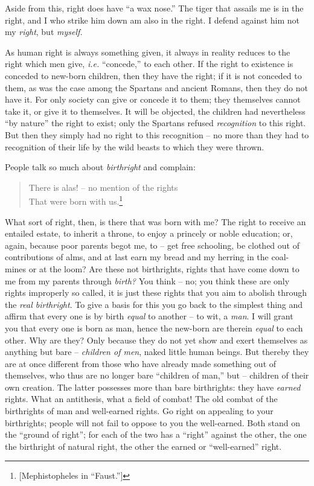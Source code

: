 Aside from this, right does have ``a wax nose.'' The tiger that assails me 
is in the right, and I who strike him down am also in the right. I defend 
against him not my \textit{right}, but \textit{myself.}

As human right is always something given, it always in reality reduces to the 
right which men give, \textit{i.e.} ``concede,'' to each other. If the right 
to existence is conceded to new-born children, then they have the right; if it 
is not conceded to them, as was the case among the Spartans and ancient 
Romans, then they do not have it. For only society can give or concede it to 
them; they themselves cannot take it, or give it to themselves. It will be 
objected, the children had nevertheless ``by nature'' the right to exist; 
only the Spartans refused \textit{recognition} to this right. But then they 
simply had no right to this recognition -- no more than they had to 
recognition of their life by the wild beasts to which they were thrown.

People talk so much about \textit{birthright} and complain:

\begin{quotation}

\noindent{} There is alas! -- no mention of the rights\\
 That were born with us.\footnote{[Mephistopheles in ``Faust.'']} 
\end{quotation}

\noindent{}What sort of right, then, is there that was born with me? The right 
to receive an entailed estate, to inherit a throne, to enjoy a princely or 
noble education; or, again, because poor parents begot me, to -- get free 
schooling, be clothed out of contributions of alms, and at last earn my bread 
and my herring in the coal-mines or at the loom? Are these not birthrights, 
rights that have come down to me from my parents through \textit{birth?} You 
think -- no; you think these are only rights improperly so called, it is just 
these rights that you aim to abolish through the \textit{real birthright}. To 
give a basis for this you go back to the simplest thing and affirm that every 
one is by birth \textit{equal} to another -- to wit, a \textit{man}. I will 
grant you that every one is born as man, hence the new-born are therein 
\textit{equal} to each other. Why are they? Only because they do not yet show 
and exert themselves as anything but bare -- \textit{children of men}, naked 
little human beings. But thereby they are at once different from those who 
have already made something out of themselves, who thus are no longer bare 
``children of man,'' but -- children of their own creation. The latter 
possesses more than bare birthrights: they have \textit{earned} rights. What 
an antithesis, what a field of combat! The old combat of the birthrights of 
man and well-earned rights. Go right on appealing to your birthrights; people 
will not fail to oppose to you the well-earned. Both stand on the ``ground of 
right''; for each of the two has a ``right'' against the other, the one the 
birthright of natural right, the other the earned or ``well-earned'' right.

